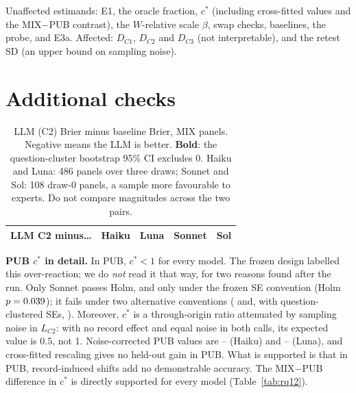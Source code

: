 \documentclass[11pt,letterpaper]{article}
\newcommand{\cstar}{c^{*}}
\begin{document}
\begin{table}[h]
\centering\footnotesize
\caption{Identical-text pairs: PUB panels where the control and farmed prompts differ only by the nonce line. Mean
(control $-$ farmed) probability, implied contribution to $D$, and change in reasoning tokens per call.
Question-cluster bootstrap 95\% CIs; \textbf{bold} excludes 0.}
\label{tab:nonce}
\end{table}
Unaffected estimands: E1, the oracle fraction, $\cstar$ (including cross-fitted values and the MIX$-$PUB contrast),
the $W$-relative scale $\beta$, swap checks, baselines, the probe, and E3a. Affected: $D_{C1}$, $D_{C2}$ and $D_{C3}$ (not interpretable),
and the retest SD (an upper bound on sampling noise).

\section{Additional checks}\label{app:extra}
\begin{table}[h]
\centering\footnotesize
\caption{LLM (C2) Brier minus baseline Brier, MIX panels. Negative means the LLM is better. \textbf{Bold}: the
question-cluster bootstrap 95\% CI excludes 0. Haiku and Luna: 486 panels over three draws; Sonnet and Sol: 108 draw-0 panels, a sample more favourable to experts. Do not compare magnitudes across the two pairs.}
\label{tab:base}
\begin{tabular}{@{}lrrrr@{}}
\toprule
LLM C2 minus\ldots & Haiku & Luna & Sonnet & Sol \\
\midrule

\end{tabular}
\end{table}

\textbf{PUB $\cstar$ in detail.} In PUB, $\cstar<1$ for every model. The frozen design labelled this over-reaction; we do \emph{not} read it that way,
for two reasons found after the run. Only Sonnet passes Holm, and only under the frozen SE convention (Holm
$p=0.039$); it fails under two alternative conventions (\sonnetPubHolmExact{} and, with
question-clustered SEs, \sonnetPubHolmCons). Moreover, $\cstar$ is a through-origin ratio attenuated by sampling noise
in $L_{C2}$: with no record effect and equal noise in both calls, its expected value is $0.5$, not 1. Noise-corrected
PUB values are \noiseCorrPubHaikuA--\noiseCorrPubHaikuB{} (Haiku) and \noiseCorrPubLunaA--\noiseCorrPubLunaB{} (Luna),
and cross-fitted rescaling gives no held-out gain in PUB. What is supported is that in PUB, record-induced shifts add no
demonstrable accuracy. The MIX$-$PUB difference in $\cstar$ is directly supported for every model (Table~\ref{tab:rq12}).
\end{document}
